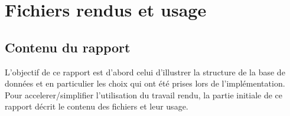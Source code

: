 \documentclass[twoside,openright,a4paper,11pt,french]{article}
\begin{document}
\pagestyle{plain}
\setlength{\parindent}{0pt}



\parskip=0pt
\tableofcontents


\vspace{5cm}


\section{Fichiers rendus et usage}
\subsection{Contenu du rapport}
L'objectif de ce rapport est d'abord celui d'illustrer la structure de la base
de données et en particulier les choix qui ont été prises lors de
l'implémentation. Pour accelerer/simplifier l'utilisation du travail rendu, la
partie initiale de ce rapport décrit le contenu des fichiers et leur usage.
\end{document}
